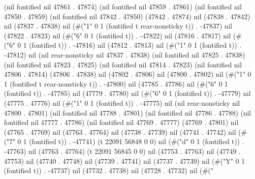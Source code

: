 (nil fontified nil 47861 . 47874) (nil fontified nil 47859 . 47861) (nil fontified nil 47850 . 47859) (nil fontified nil 47842 . 47850) (47842 . 47874) nil (47838 . 47842) nil (47837 . 47838) nil (#("1" 0 1 (fontified t rear-nonsticky t)) . -47837) nil (47822 . 47823) nil (#("6" 0 1 (fontified t)) . -47822) nil (47816 . 47817) nil (#("6" 0 1 (fontified t)) . -47816) nil (47812 . 47813) nil (#("1" 0 1 (fontified t)) . -47812) nil (nil rear-nonsticky nil 47837 . 47838) (nil fontified nil 47825 . 47838) (nil fontified nil 47823 . 47825) (nil fontified nil 47814 . 47823) (nil fontified nil 47806 . 47814) (47806 . 47838) nil (47802 . 47806) nil (47800 . 47802) nil (#("1" 0 1 (fontified t rear-nonsticky t)) . -47800) nil (47785 . 47786) nil (#("6" 0 1 (fontified t)) . -47785) nil (47779 . 47780) nil (#("6" 0 1 (fontified t)) . -47779) nil (47775 . 47776) nil (#("1" 0 1 (fontified t)) . -47775) nil (nil rear-nonsticky nil 47800 . 47801) (nil fontified nil 47788 . 47801) (nil fontified nil 47786 . 47788) (nil fontified nil 47777 . 47786) (nil fontified nil 47769 . 47777) (47769 . 47801) nil (47765 . 47769) nil (47763 . 47764) nil (47738 . 47739) nil (47741 . 47742) nil (#("7" 0 1 (fontified t)) . -47741) (t 22091 56848 0 0) nil (#("d" 0 1 (fontified t)) . -47763) nil (47763 . 47764) (t 22091 56845 0 0) nil (47753 . 47763) nil (47749 . 47753) nil (47740 . 47748) nil (47739 . 47741) nil (47737 . 47739) nil (#("Y" 0 1 (fontified t)) . -47737) nil (47732 . 47738) nil (47728 . 47732) nil (#("
